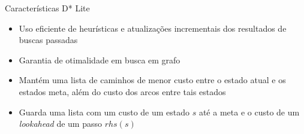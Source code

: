 \documentclass[10pt]{beamer}
\begin{document}
\begin{frame}{Características D* Lite}
\begin{itemize}
\item Uso eficiente de heurísticas e atualizações incrementais dos resultados de buscas passadas
\vspace{0.5cm}
\item Garantia de otimalidade em busca em grafo
\vspace{0.5cm}
\item Mantém uma lista de caminhos de menor custo entre o estado atual e os estados meta, além do custo dos arcos entre tais estados
\vspace{0.5cm}
\item Guarda uma lista com um custo de um estado $s$ até a meta e o custo de um \textit{lookahead} de um passo $rhs(s)$
\end{itemize}
\end{frame}
\end{document}

